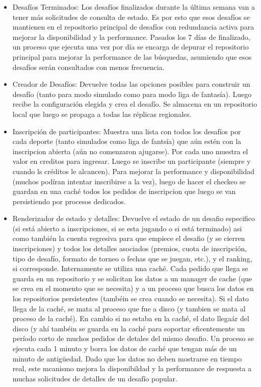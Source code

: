 \begin{itemize}
\item Desafíos Terminados: Los desafíos finalizados durante la última semana van a tener más solicitudes de consulta de estado. Es por esto que esos desafíos se mantienen
en el repositorio principal de desafíos con redundancia activa para mejorar la disponibilidad y la performance. Pasados los 7 días de finalizado, un proceso que ejecuta una vez por día se encarga de depurar el repositorio principal para mejorar la performance de las búsquedas, asumiendo que esos desafíos serán consultados con menos frecuencia.

\item Creador de Desafíos: Devuelve todas las opciones posibles para construir un desafío (tanto para modo simulado como para modo liga de fantasía). Luego recibe la configuración elegida y crea el desafío. Se almacena en un repositorio local que luego se propaga a todas las réplicas regionales.

\item Inscripción de participantes: Muestra una lista con todos los desafíos por cada deporte (tanto simulados como liga de fantsía) que aún estén con la inscripcion abierta (aún no comenzaron ajugarse). Por cada uno muestra el valor en creditos para ingresar. Luego se inscribe un participante (siempre y cuando ls créditos le alcancen). Para mejorar la performance y disponibilidad (muchos podíran intentar inscribirse a la vez), luego de hacer el checkeo se guardan en una caché todos los pedidos de  inscripcion que luego se van persistiendo por procesos dedicados.

\item Renderizador de estado y detalles: Devuelve el estado de un desafio especifico (si está abierto a inscripciones, si se esta jugando o si está terminado) asi como también la cuenta regresiva para que empiece el desafio (y se cierren inscripciones) y todos los detalles asociados (premios, cuota de inscripción, tipo de desafío, formato de torneo o fechas que se juegan, etc.), y el ranking, si corresponde. Internamente se utiliza una caché. Cada pedido que llega se guarda en un repositorio y se solicitan los datos a un manager de cache (que se crea en el momento que se necesita) y a un proceso que busca los datos en los repositorios persistentes (tambéin se crea cuando se necesita). Si el dato llega de la caché, se mata al proceso que  fue a disco (y tambien se mata al proceso de la caché). En cambio si no estaba en la caché, el dato llegaár del disco (y ahí tambéin se guarda en la caché para soportar eficentemente un período corto de muchos pedidos de detales del mismo desafio. Un proceso se ejecuta cada 1 minuto y borra los datos de caché que tengan más de un minuto de antigüedad. Dado que los datos no deben mostrarse en tiempo real, este mcanismo mejora la disponibildad y la performance de respuesta a muchas solicitudes de detalles de un desafío popular.
\end{itemize}

